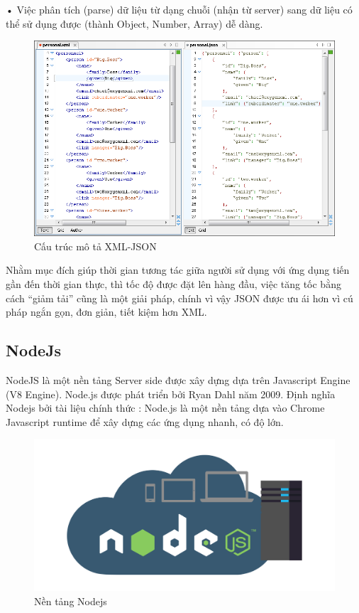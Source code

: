 • Việc phân tích (parse) dữ liệu từ dạng chuỗi (nhận từ server) sang dữ liệu có thể sử dụng được (thành Object, Number, Array) dễ dàng.
\begin{figure}[H]
	\centering    
	\includegraphics[width=1.0\textwidth]{json3}
	\caption[Cấu trúc mô tả XML-JSON]{Cấu trúc mô tả XML-JSON}
	\label{fig: json3}
\end{figure}
Nhằm mục đích giúp thời gian tương tác giữa người sử dụng với ứng dụng tiến gần đến thời gian thực, thì tốc độ được đặt lên hàng đầu, việc tăng tốc bằng cách “giảm tải” cũng là một giải pháp, chính vì vậy JSON được ưu ái hơn vì cú pháp ngắn gọn, đơn giản, tiết kiệm hơn XML.



\subsection{NodeJs}
NodeJS là một nền tảng Server side được xây dựng dựa trên Javascript Engine (V8 Engine). Node.js được phát triển bởi Ryan Dahl năm 2009. Định nghĩa Nodejs bởi tài liệu chính thức : Node.js là một nền tảng dựa vào Chrome Javascript runtime để xây dựng các ứng dụng nhanh, có độ lớn. 

\begin{figure}[H]
	\centering    
	\includegraphics[width=1.0\textwidth]{nodejs0}
	\caption[Nền tảng Nodejs]{Nền tảng Nodejs}
	\label{fig: nodejs0}
\end{figure}

